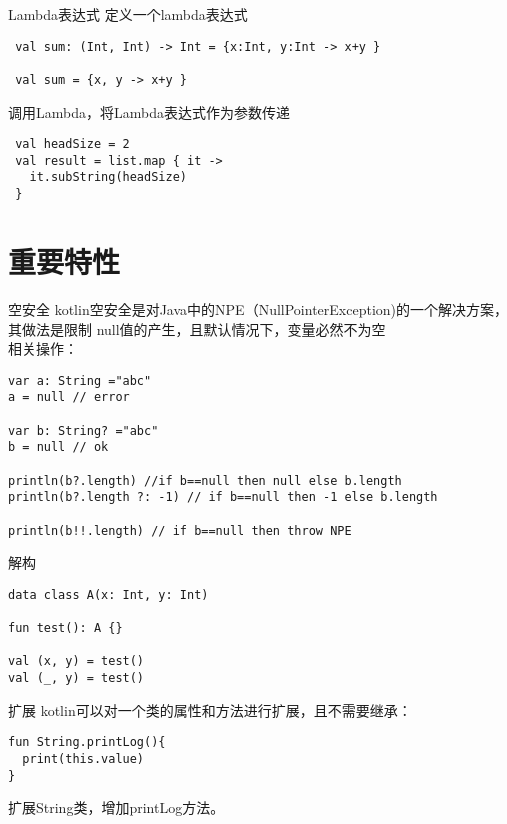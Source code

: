 \documentclass[UTF8]{ctexbeamer}
\begin{document}
\begin{frame}[fragile]{Lambda表达式}
定义一个lambda表达式
\begin{lstlisting}
 val sum: (Int, Int) -> Int = {x:Int, y:Int -> x+y }

 val sum = {x, y -> x+y }
\end{lstlisting}
 \vspace{40pt}
调用Lambda，将Lambda表达式作为参数传递
\begin{lstlisting}
 val headSize = 2
 val result = list.map { it ->
   it.subString(headSize)
 }
\end{lstlisting}
\end{frame}


\section{重要特性}
\frame{\tableofcontents[currentsection]}
\begin{frame}[fragile]{空安全}
  kotlin空安全是对Java中的NPE（NullPointerException)的一个解决方案，其做法是限制
  null值的产生，且默认情况下，变量必然不为空
  \\
  相关操作：
\begin{lstlisting}
var a: String ="abc"
a = null // error

var b: String? ="abc"
b = null // ok

println(b?.length) //if b==null then null else b.length
println(b?.length ?: -1) // if b==null then -1 else b.length

println(b!!.length) // if b==null then throw NPE
\end{lstlisting}
\end{frame}

\begin{frame}[fragile]{解构}
\begin{lstlisting}
data class A(x: Int, y: Int)

fun test(): A {}

val (x, y) = test()
val (_, y) = test()
\end{lstlisting}
\end{frame}

\begin{frame}[fragile]{扩展}
  kotlin可以对一个类的属性和方法进行扩展，且不需要继承：
\begin{lstlisting}
fun String.printLog(){
  print(this.value)
}
\end{lstlisting}
  扩展String类，增加printLog方法。
\end{frame}
\end{document}
